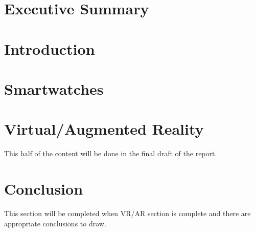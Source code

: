 \documentclass[12pt, titlepage, onecolumn]{article}
\begin{document}
\begin{titlepage}

\end{titlepage}
\frontmatter
\section*{Executive Summary}

\clearpage
\begin{singlespace}
\tableofcontents
\clearpage
\end{singlespace}
\clearpage
\setlength{\parindent}{0em}
\setlength{\parskip}{1em}
\mainmatter

\section{Introduction}


\clearpage
\section{Smartwatches}


\clearpage
\section{Virtual/Augmented Reality}
This half of the content will be done in the final draft of the report.

\clearpage
\section{Conclusion}
This section will be completed when VR/AR section is complete and there are appropriate conclusions
to draw.
\clearpage
\backmatter
\begin{singlespace}


\clearpage
\end{singlespace}
\end{document}
